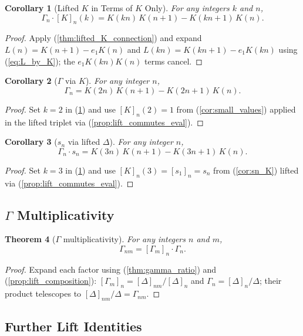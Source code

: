 \documentclass[12pt]{article}
\newtheorem{theorem}{Theorem}[section]
\newtheorem{corollary}[theorem]{Corollary}
\theoremstyle{definition}
\newcommand{\lift}[2]{[#1]_{#2}}
\newcommand{\Gdelta}[1]{\Gamma_{#1}}
\begin{document}
	\begin{corollary}[Lifted $K$ in Terms of $K$ Only]
		\label{cor:lifted_K_pure}
		For any integers $k$ and $n$,
		\[
		\Gdelta{n} \cdot \lift{K}{n}(k)
		= K(kn)\,K(n+1) - K(kn+1)\,K(n).
		\]
	\end{corollary}
	\begin{proof}
		Apply (\ref{thm:lifted_K_connection}) and expand $L(n) = K(n+1) - e_1 K(n)$ and $L(kn) = K(kn+1) - e_1 K(kn)$ using (\ref{eq:L_by_K}); the $e_1 K(kn) K(n)$ terms cancel.
	\end{proof}
	
	\begin{corollary}[$\Gamma$ via $K$]
		\label{cor:delta_ratio}
		For any integer $n$,
		\[ \Gdelta{n} = K(2n)\,K(n+1) - K(2n+1)\,K(n). \]
	\end{corollary}
	\begin{proof}
		Set $k = 2$ in (\ref{cor:lifted_K_pure}) and use $\lift{K}{n}(2) = 1$ from (\ref{cor:small_values}) applied in the lifted triplet via (\ref{prop:lift_commutes_eval}).
	\end{proof}
	
	\begin{corollary}[$s_n$ via lifted $\Delta$]
		\label{cor:sn_lifted}
		For any integer $n$,
		\[ \Gdelta{n} \cdot s_n = K(3n)\,K(n+1) - K(3n+1)\,K(n). \]
	\end{corollary}
	\begin{proof}
		Set $k = 3$ in (\ref{cor:lifted_K_pure}) and use $\lift{K}{n}(3) = \lift{s_1}{n} = s_n$ from (\ref{cor:sn_K}) lifted via (\ref{prop:lift_commutes_eval}).
	\end{proof}
	
	\subsection{$\Gamma$ Multiplicativity}
	\begin{theorem}[$\Gamma$ multiplicativity]
		\label{thm:gamma_mult}
		For any integers $n$ and $m$,
		\[ \Gdelta{nm} = \lift{\Gdelta{m}}{n} \cdot \Gdelta{n}. \]
	\end{theorem}
	\begin{proof}
		Expand each factor using (\ref{thm:gamma_ratio}) and (\ref{prop:lift_composition}): $\lift{\Gdelta{m}}{n} = \lift{\Delta}{nm}/\lift{\Delta}{n}$ and $\Gdelta{n} = \lift{\Delta}{n}/\Delta$; their product telescopes to $\lift{\Delta}{nm}/\Delta = \Gdelta{nm}$.
	\end{proof}
	
	\subsection{Further Lift Identities}
	
\end{document}
